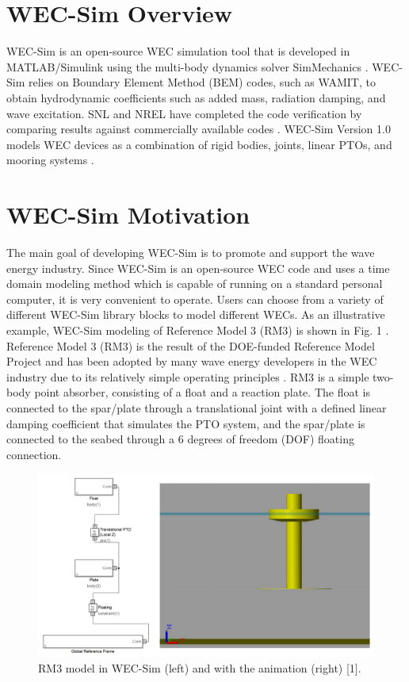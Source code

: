 \documentclass[conference]{IEEEtran}
\begin{document}
\section{WEC-Sim Overview}

WEC-Sim is an open-source WEC simulation tool that is developed in MATLAB/Simulink using the multi-body dynamics solver SimMechanics \cite{wecsim}. WEC-Sim relies on Boundary Element Method (BEM) codes, such as WAMIT, to obtain hydrodynamic coefficients such as added mass, radiation damping, and wave excitation. SNL and NREL have completed the code verification by comparing results against commercially available codes \cite{ruehl2014preliminary}\cite{ruehl2014development}. WEC-Sim Version 1.0 models WEC devices as a combination of rigid bodies, joints, linear PTOs, and mooring systems \cite{yu2014design}\cite{lawson2014implementing}. 

\section{WEC-Sim Motivation}
The main goal of developing WEC-Sim is to promote and support the wave energy industry. Since WEC-Sim is an open-source WEC code and uses a time domain modeling method which is capable of running on a standard personal computer, it is very convenient to operate. Users can choose from a variety of different WEC-Sim library blocks to model different WECs.  As an illustrative example, WEC-Sim modeling of Reference Model 3 (RM3) is shown in Fig. 1  \cite{wecsim}\cite{ruehl2014preliminary}.  Reference Model 3 (RM3) is the result of the DOE-funded Reference Model Project and has been adopted by many wave energy developers in the WEC industry due to its relatively simple operating principles \cite{sandia}. RM3 is a simple two-body point absorber, consisting of a float and a reaction plate. The float is connected to the spar/plate through a translational joint with a defined linear damping coefficient that simulates the PTO system, and the spar/plate is connected to the seabed through a 6 degrees of freedom (DOF) floating connection.

\begin{figure}[t]
    \centering
    \includegraphics[width=1\columnwidth]{Images/RM3}
    \caption{RM3 model in WEC-Sim (left) and with the animation (right) [1].}
    \end{figure}
\end{document}
